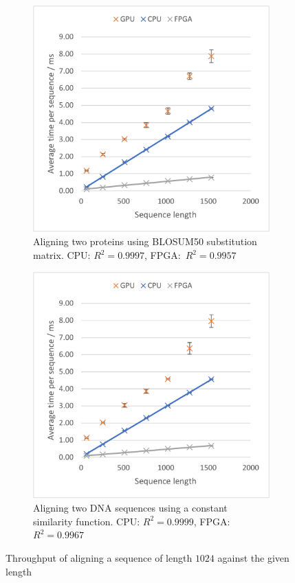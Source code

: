 \begin{figure}[H]
    \centering
    \begin{subfigure}{.49\textwidth}
      \centering
      \includegraphics[width=\linewidth]{figs/eval/all3_blosum.pdf}
      \caption{Aligning two proteins using BLOSUM50 \mbox{substitution} matrix. CPU: $R^2=0.9997$, FPGA:~${R^2=0.9957}$}
      \label{fig:All3_BLOSUM}
    \end{subfigure}%
    \hfill
    \begin{subfigure}{.49\textwidth}
      \centering
      \includegraphics[width=\linewidth]{figs/eval/all3_dna.pdf}
      \caption{Aligning two DNA sequences using a constant similarity function. CPU: $R^2=0.9999$, FPGA:~${R^2=0.9967}$}
      \label{fig:All3_DNA}
    \end{subfigure}
    \caption{Throughput of aligning a sequence of length $1024$ against the given length}
    \label{fig:All3}
\end{figure}

